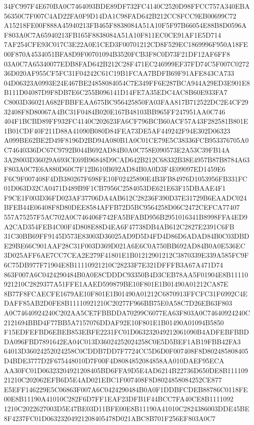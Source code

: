 \documentclass[UTF8,fontset=fandol,zihao=-4,a4paper]{ctexart}
\begin{document}
{{34FC997F4E670BA0C7464093BDE89DF732FC4140C2520D98FFCC757A340EBA56350C7F007C4AD22FA0F9D14DA1C98FAD642B212CC8FCC9EB00699C72
A15218FE00F888A45940213FB465F8838084A51A10F5F97B66054E88B8D0596AF803A0C7A65940213FB165F8838084A51A10F811EC0CE91AF1E5D714
7AF254CFE93C017C3E22A0E1CED3F00701212CD8F529EC1869996F950A18FE00F870A4534051BFA8D9F00701094B3520FCB3F8C0D73F21DF12AF6FF8
03A0C7A65340077EDB8FAD642B212C28F471EC246999EF37FD74C5F007C027236D020AF955CF5FC31F04242C61C19B1FCAA7BDFB69F91AFE843CA733
04D06323A0993E24E467BE24858084054C7E349FF6E287BCA944A29ED3E901E8B111D04087D9F8DB7E6C255B096141D14FE7A35EDC4AC8B60E933FA7
C8003D36021A682FBBFEAA675BC956425850FA03FAA817B712522DC2E4CF2932408F8D80067A4BC31F0484B020E167B48103BB965FF247951AA0C746
404F1BCBD89FF932FC4140C202623FA6CF796BCB60ACF57A43F282581B801E1B01CDF40F211D88A41090B080D84FEA73DE5AF449242F94E302D06323
A099BE62BE2D49F8196D2BD94A080B1A0C01CE79E5C38336FCB953376705A0C74640336DC67C9792B044B692AD84B0A0C758E090573E2A53C39FB14A
3A28003D36029A693CE69B96848D9CAD642B212C68332B38E4957B87B8784A63F803A0C7E6A880D60C7F12B610B692AD84B0A0D3F4E09097ED1459E6
F6C9F007408F4DB380267F698FE10F02425890E4B3FB84976D1053956FB331FC01D063D32CA0471D489B9F1CB7956C2584053DE621E63F15DBAAE4F1
F9CE1F003D36FD023AF37706DA4AB612C28236F390D37E31729B6EAADC024BFEB44E06408F8D80DEE8584AFFB72D5BC9564258D06C2472CEFCA77407
557A75257F5AC702A0C746406F742FA5BFABD956B2951016341B8998FFA4ED9A2CAD354FEB4C00F4D808E88D4EA6F47738DB4AB612C2827E2391C6FB
31C30BB69FF9145D573E83003D36025AD9D5D4FD4D86D6ADAD84B0C03DBDE29BE66C901AAF28C31F003D369D021A6E6C0A750BB692AD84B0A0E536EC
3D025AFF6AE7CC7CEA2E279F41801E1B01212901212C3870339E339A585FC9F6C75DB977F71904E8B11110921210C28233F7E321DFFFB3A67A471D74
863F007A6C0424290484B0A0E8CDDDC93350B4D3CEB78AA5F01904E8B11110921210C2829377A51FFE1AAED599879BE10F801E1B01490A01212CA87E
8B77F8FCAECFE1679AE10F801E1B01490A01212C6870913FFCFC31F6992C4EDAFF85AB2D0FE8B11110921210C20277F966BB75E0A58C7D26EB63F803
A0C74640924240C202AA5CE7FBBDDA70299C6077EA63F803A0C74640924240C2121694BBD4F77BB5A7157076DDAF92E10F801E1B01490A01094B5850
F15EDFEFBD6EBEB853EBFE2231FC01D063232049212061090B4ADFEBFBBDDA096FBD7891642EA04C013D36024252024258C0E5D5BEF1AB19FBB42FA3
64013D36024252024258C0CDDB7DD7F7724CC5D6D0F007408F8D802485808405D4BDE3777D2F675448010D7F00F4D8084852084858AA010DAEF95ECA
AA30FC01D06323204921208405BD6FFA9D5E4AD6214B22736D650DE8B11110921210C202062EFB6D5E4AD021EBC1F007408F8D8024858084252CE877
E5EFF146229E5C06863F007A6C0424290484B0A0F1DDBFCDEB88786C0118FE00E8B11190A41010C282F6D7FF1EAF23DFB1F44BCC7FA40CE8B1111092
1210C2022627003D5E47BE03D11BFE00E8B11190A41010C2824386003DDE45BE8F4237FC01D06323204921208405478D021ABC8B701F256EF803A0C7
}}
\end{document}
